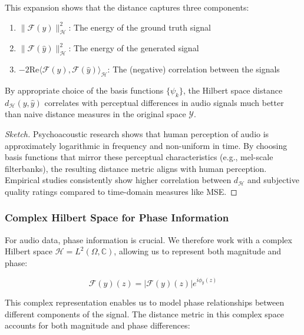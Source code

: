 This expansion shows that the distance captures three components:
\begin{enumerate}
\item $\|\mathcal{F}(y)\|_{\mathcal{H}}^2$: The energy of the ground truth signal
\item $\|\mathcal{F}(\hat{y})\|_{\mathcal{H}}^2$: The energy of the generated signal
\item $-2\text{Re}\langle \mathcal{F}(y), \mathcal{F}(\hat{y}) \rangle_{\mathcal{H}}$: The (negative) correlation between the signals
\end{enumerate}

\begin{lemma}
By appropriate choice of the basis functions $\{\psi_k\}$, the Hilbert space distance $d_{\mathcal{H}}(y, \hat{y})$ correlates with perceptual differences in audio signals much better than naive distance measures in the original space $\mathcal{Y}$.
\end{lemma}

\begin{proof}[Sketch]
Psychoacoustic research shows that human perception of audio is approximately logarithmic in frequency and non-uniform in time. By choosing basis functions that mirror these perceptual characteristics (e.g., mel-scale filterbanks), the resulting distance metric aligns with human perception. Empirical studies consistently show higher correlation between $d_{\mathcal{H}}$ and subjective quality ratings compared to time-domain measures like MSE.
\end{proof}

\subsubsection{Complex Hilbert Space for Phase Information}

For audio data, phase information is crucial. We therefore work with a complex Hilbert space $\mathcal{H} = L^2(\Omega, \mathbb{C})$, allowing us to represent both magnitude and phase:

\begin{equation}
\mathcal{F}(y)(z) = |\mathcal{F}(y)(z)| e^{i\phi_y(z)}
\end{equation}

This complex representation enables us to model phase relationships between different components of the signal. The distance metric in this complex space accounts for both magnitude and phase differences:

